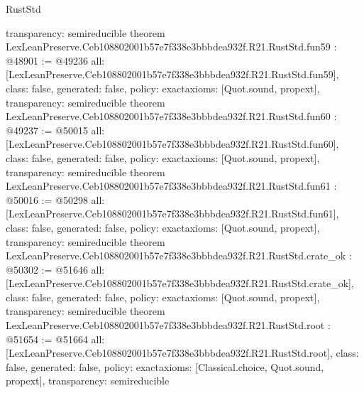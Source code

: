 \begin{lexlean}{RustStd}
\begin{coremodule}
{  transparency: semireducible
}
theorem LexLeanPreserve.Ceb108802001b57e7f338e3bbbdea932f.R21.RustStd.fun59 : @48901 := @49236 {
  all: [LexLeanPreserve.Ceb108802001b57e7f338e3bbbdea932f.R21.RustStd.fun59],
  class: false,
  generated: false,
  policy: exact{axioms: [Quot.sound, propext]},
  transparency: semireducible
}
theorem LexLeanPreserve.Ceb108802001b57e7f338e3bbbdea932f.R21.RustStd.fun60 : @49237 := @50015 {
  all: [LexLeanPreserve.Ceb108802001b57e7f338e3bbbdea932f.R21.RustStd.fun60],
  class: false,
  generated: false,
  policy: exact{axioms: [Quot.sound, propext]},
  transparency: semireducible
}
theorem LexLeanPreserve.Ceb108802001b57e7f338e3bbbdea932f.R21.RustStd.fun61 : @50016 := @50298 {
  all: [LexLeanPreserve.Ceb108802001b57e7f338e3bbbdea932f.R21.RustStd.fun61],
  class: false,
  generated: false,
  policy: exact{axioms: [Quot.sound, propext]},
  transparency: semireducible
}
theorem LexLeanPreserve.Ceb108802001b57e7f338e3bbbdea932f.R21.RustStd.crate_ok : @50302 := @51646 {
  all: [LexLeanPreserve.Ceb108802001b57e7f338e3bbbdea932f.R21.RustStd.crate_ok],
  class: false,
  generated: false,
  policy: exact{axioms: [Quot.sound, propext]},
  transparency: semireducible
}
theorem LexLeanPreserve.Ceb108802001b57e7f338e3bbbdea932f.R21.RustStd.root : @51654 := @51664 {
  all: [LexLeanPreserve.Ceb108802001b57e7f338e3bbbdea932f.R21.RustStd.root],
  class: false,
  generated: false,
  policy: exact{axioms: [Classical.choice, Quot.sound, propext]},
  transparency: semireducible
}


\end{coremodule}
\end{lexlean}
